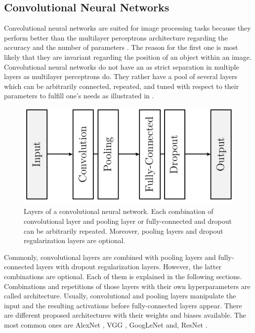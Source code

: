 \subsection{Convolutional Neural Networks}
\label{sec:neural-networks-convolutional-neural-networks}
Convolutional neural networks are suited for image processing tasks because they perform better than the multilayer perceptrons architecture regarding the accuracy and the number of parameters \cite{Lecun98} \cite{LeCun1998cnn}.
The reason for the first one is most likely that they are invariant regarding the position of an object within an image.
Convolutional neural networks do not have an as strict separation in multiple layers as multilayer perceptrons do.
They rather have a pool of several layers which can be arbitrarily connected, repeated, and tuned with respect to their parameters to fulfill one's needs as illustrated in .
\begin{figure}
	\centering
	\includegraphics[]{images/cnn_layers.pdf}
	\caption[Layers of a convolutional neural network]{Layers of a convolutional neural network. Each combination of convolutional layer and pooling layer or fully-connected and dropout can be arbitrarily repeated. Moreover, pooling layers and dropout regularization layers are optional.}
	\label{fig:cnn-layers}
\end{figure}
Commonly, convolutional layers are combined with pooling layers and fully-connected layers with dropout regularization layers.
However, the latter combinations are optional.
Each of them is explained in the following sections.
Combinations and repetitions of those layers with their own hyperparameters are called architecture.
Usually, convolutional and pooling layers manipulate the input and the resulting activations before fully-connected layers appear.
There are different proposed architectures with their weights and biases available.
The most common ones are AlexNet \cite{Krizhevsky:2012:ICD:2999134.2999257}, VGG \cite{Simonyan15}, GoogLeNet \cite{szegedy2015} and, ResNet \cite{He2016ResNet}.




